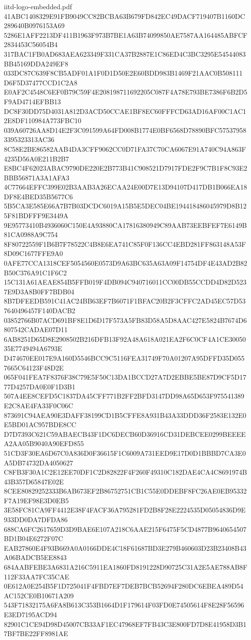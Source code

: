\begin{filecontents*}[overwrite]{iitd-logo-embedded.pdf}
41ABC1408329E91FB9049CC82BCBA63B679FD842EC49DACF719407B1160DC289640B0976153A69
5286E1AFF2213DF411B1963F973B7BE1A63B74099850AE7587AA164485ABFCF2834453C56054B4
317BAC1FB0AD683AEA623349F331CA37B2887E1C86ED4C3BC3295E54544083BB45169DDA249EF8
033DC87C639F8CB5ADF01A1F0D1D50E2E60BDD983B1469F21AAC0B508111D6F5D37477CCD1C2A8
E0AF2C4548C6EF0B79C59F4E208198711692205C087F4A78E793BE7386F6B2D5F9AD4714EFBB13
DC8F30DD75D4031A812D3ACD50CCAE1BF8EC60FFFCD63AD16AF00C1AC12E8DF110984A773FBC10
039A60726AA8D14E2F3C091599A64FD008B1774E0BF6568D78890BFC575379583395323313AC36
8C58E2BE86582AAB4DA3CFF9062CC0D71FA37C70CA6067E91A740C94A863F4235D56A0E211B2B7
E8BC4F62023ABAC9790DE220E2B773B41C908521D7917FDE2F9C7B1F8C93E2BBB56871A3A1AFA3
4C77664EFFC399E02B3AAB3A26ECAA24E00D7E13D94107D417DB1B066EA18DF8E4BED35B5677C6
5B5CA3E585E66A7B7B03DCDC6019A15B5E5DEC04BE194418486045979D8B125F81BDFFF9E3449A
9E95773410B4936060C150E4A93880CA17816380949C89AAB73EEBFEF7E6149B81CA0988A9C754
8F80722559F1B6B7F78522C4B8E6EA741C85F0F136CC4EBD281FF863148A53F8D09C1677FFE9A0
0AFE77CCA1318CEF5054560E0573D9A63BC635A63A09F14754DF4E43AD2B82B50C376A91C1F6C2
15C131A61AEAE854B5FFB019F4DB094C940716011CC00DB55CCDD4D82D5237E9D3A8B0FF7BDB04
8B7DFEEDB591C41AC24BB63EF7B6071F1BFAC20B2F3CFFC2AD45EC57D537640496457F140DACB2
03852766B07ACD691BF8E1D6D17F573A5FB83D58A5D8AAC427E5824B7674D6807542CADAE07D11
6AB8251D65D8E2908502B216DFB13F92A48A618A021EA2F6C0CF4A1CE3005035E7749494A6793E
D474670EE017E9A160D5546BCC9C5116FEA31749F70A01207A95DFFD35D0557665C64123F48D2E
065F041FEA7F8376F38C79E5F50C13DA1BCCD27A7D2EBBE5BE87D9CF5D1777D4257DA0E0F1D3B1
507A4EE8CEFD5C1837DA45CFF771B2FF2BFD3147DD98A65D653F975541389E2C8AE4FA33F0C06C
873691C94AEA90E3DAFF38199CD1B5CFFE8A931B43A33DDD36F2583E132E0E5BD01AC957BDE8CC
D7D7393C621C59ABAECB43F1DC6DECB60D36916CD31DEBCEE0299BEEEEA2AA05B9040A90EFD855
51CD3F30EA6D67C0A836D0F36615F1C6009A731EED9E17D0D1BBBD7CA3E0A5DB74732DA4050627
C8FB3F30A1C2E12EE70DF1C2D82822F4F260F49310C182DAE4CA4C8691974B43B357D65847E02E
8CEE80829252333B6AB673EF2B86752751CB1C55E0DDEBF8FC26AE0EB95332F7A19EF98E3D0EB5
3E58FC81CA9FF4412E38F4FACF36A795281FD2B8F28E2224535D05054836D9E933DD0DA7DFDA86
688CA6FC2617659D3D9BAE6E107A218C6AAE215F6475F5CD4877B9640654507BD1B04E6272F07C
EAB27860E4F93B669A0A0166DDE4C18F61687BD3E279B460603D23B23408B43A06BADCB5EE8843
684AABFEBE3A6831A216C5911EA1860FD8191228D90725C31A2E5AE788AB8F112F33AA7FC35CAE
0E612A0E254B5F1D725041F4FBD7EF7DEB7BCB52694F280DC6EBEA489D54AC152CE0B10671A209
543F71832175A6FA8B613C353B1664D1F179614F03FD0E74505614F8E28F56596E3ED7195ACD94
82901C1CE94D98D45007CB33AF1EC47968EF7FB43C3E800FD7D8E41958D3B17BF7BE22FF8981AE

\end{filecontents*}
